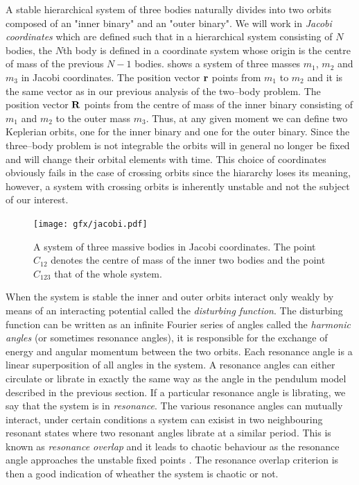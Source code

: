 \documentclass[ twoside,openright,titlepage,numbers=noenddot,headinclude,%
                footinclude=true,cleardoublepage=empty,abstractoff, %
                BCOR=5mm,paper=a4,fontsize=11pt,%
                american,%
                ]{scrreprt}
\begin{document}
A stable hierarchical system of three bodies naturally divides into
two orbits composed of an "inner binary" and an "outer binary". We will work
in \emph{Jacobi coordinates} which are defined such that in a hierarchical
system consisting of $N$ bodies, the $N$th body is defined in a coordinate 
system whose origin is the centre of mass of the previous $N-1$ bodies. 
 shows a system of three masses $m_1$, $m_2$ and $m_3$ in
Jacobi coordinates. The position vector $\boldsymbol{\mathbf{r}}$ points from $m_1$ to $m_2$ 
and it is the same vector as in our previous analysis of the two--body 
problem. The position vector $\boldsymbol{\mathbf{R}}$ points from the centre of mass
of the inner binary consisting of $m_1$ and $m_2$ to the outer mass $m_3$.
Thus, at any given moment we can define two Keplerian orbits, one for
the inner binary and one for the outer binary. Since the three--body
problem is not integrable the orbits will in general no longer be fixed
and will change their orbital elements with time. This choice of coordinates
obviously fails in the case of crossing orbits since the hiararchy loses
its meaning, however, a system with crossing orbits is inherently unstable
and not the subject of our interest.
\begin{figure}[htb]
\centering
\texttt{[image: gfx/jacobi.pdf]}
    \caption{A system of three massive bodies in Jacobi coordinates. 
    The point $C_{12}$ denotes the centre of mass of the inner two 
    bodies and the point $C_{123}$ that of the whole system.}
\label{fig:jacobi}
\end{figure}

When the system is stable the inner and outer orbits interact only 
weakly by means of an interacting potential called the 
\emph{disturbing function}. The disturbing function can be written
as an infinite Fourier series of angles called the \emph{harmonic
angles} (or sometimes resonance angles), it is responsible for the exchange of energy and angular 
momentum between the two orbits.  Each resonance angle is a linear
superposition of all angles in the system. A resonance angles can either 
circulate or librate in exactly the same way as the angle in the pendulum model
described in the previous section.
If a particular resonance angle is librating, we say that the system
is in \emph{resonance}. The various resonance angles can mutually 
interact, under certain conditions a system can exisist in two 
neighbouring resonant states where two resonant angles librate 
at a similar period. This is known as \emph{resonance overlap} 
and it leads to chaotic behaviour as the resonance angle approaches
the unstable fixed points \citep{WalkerFord1969}. The resonance
overlap criterion is then a good indication of wheather the
system is chaotic or not.
\end{document}

